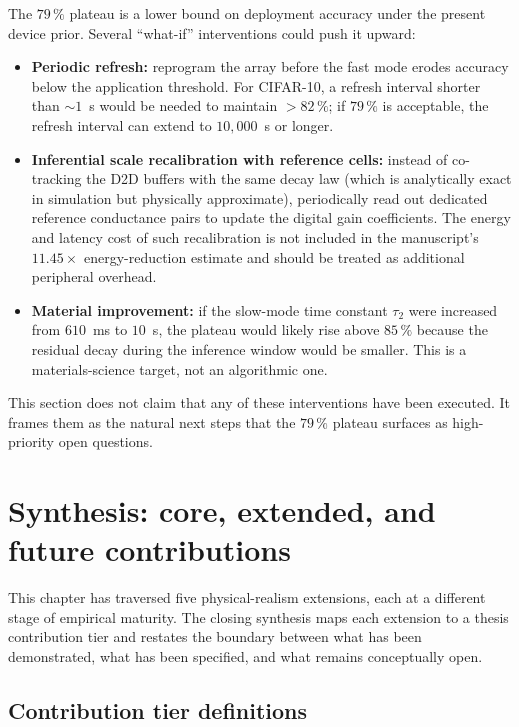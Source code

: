 The $79\,\%$ plateau is a lower bound on deployment accuracy under the present device prior.  Several ``what-if'' interventions could push it upward:
\begin{itemize}[leftmargin=1.4em]
    \item \textbf{Periodic refresh:} reprogram the array before the fast mode erodes accuracy below the application threshold.  For CIFAR-10, a refresh interval shorter than $\sim$$1$~s would be needed to maintain $>82\,\%$; if $79\,\%$ is acceptable, the refresh interval can extend to $10{,}000$~s or longer.
    \item \textbf{Inferential scale recalibration with reference cells:} instead of co-tracking the D2D buffers with the same decay law (which is analytically exact in simulation but physically approximate), periodically read out dedicated reference conductance pairs to update the digital gain coefficients.  The energy and latency cost of such recalibration is not included in the manuscript's $11.45\times$ energy-reduction estimate and should be treated as additional peripheral overhead.
    \item \textbf{Material improvement:} if the slow-mode time constant $\tau_{2}$ were increased from $610$~ms to $10$~s, the plateau would likely rise above $85\,\%$ because the residual decay during the inference window would be smaller.  This is a materials-science target, not an algorithmic one.
\end{itemize}

This section does not claim that any of these interventions have been executed.  It frames them as the natural next steps that the $79\,\%$ plateau surfaces as high-priority open questions.


\section{Synthesis: core, extended, and future contributions}
\label{sec:pr-synthesis}

This chapter has traversed five physical-realism extensions, each at a different stage of empirical maturity.  The closing synthesis maps each extension to a thesis contribution tier and restates the boundary between what has been demonstrated, what has been specified, and what remains conceptually open.

\subsection{Contribution tier definitions}

